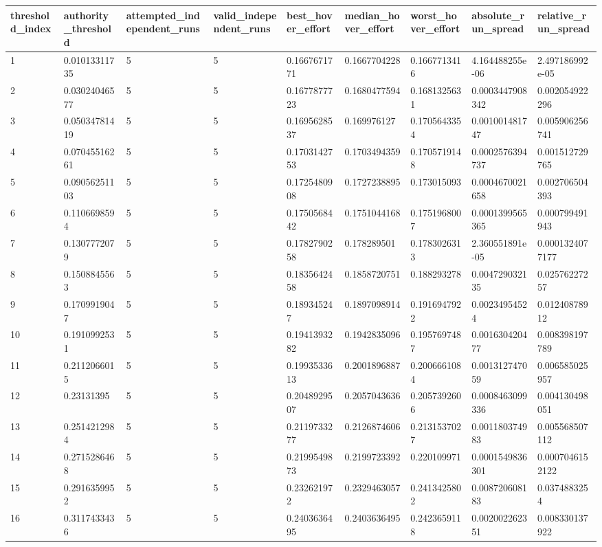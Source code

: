 \begin{tabular}{@{}lllllllll@{}}
\toprule
threshold\_index & authority\_threshold & attempted\_independent\_runs & valid\_independent\_runs & best\_hover\_effort & median\_hover\_effort & worst\_hover\_effort & absolute\_run\_spread & relative\_run\_spread \\
\midrule
1 & 0.01013311735 & 5 & 5 & 0.1667671771 & 0.1667704228 & 0.1667713416 & 4.164488255e-06 & 2.497186992e-05 \\
2 & 0.03024046577 & 5 & 5 & 0.1677877723 & 0.1680477594 & 0.1681325631 & 0.0003447908342 & 0.002054922296 \\
3 & 0.05034781419 & 5 & 5 & 0.1695628537 & 0.169976127 & 0.1705643354 & 0.001001481747 & 0.005906256741 \\
4 & 0.07045516261 & 5 & 5 & 0.1703142753 & 0.1703494359 & 0.1705719148 & 0.0002576394737 & 0.001512729765 \\
5 & 0.09056251103 & 5 & 5 & 0.1725480908 & 0.1727238895 & 0.173015093 & 0.0004670021658 & 0.002706504393 \\
6 & 0.1106698594 & 5 & 5 & 0.1750568442 & 0.1751044168 & 0.1751968007 & 0.0001399565365 & 0.000799491943 \\
7 & 0.1307772079 & 5 & 5 & 0.1782790258 & 0.178289501 & 0.1783026313 & 2.360551891e-05 & 0.0001324077177 \\
8 & 0.1508845563 & 5 & 5 & 0.1835642458 & 0.1858720751 & 0.188293278 & 0.004729032135 & 0.02576227257 \\
9 & 0.1709919047 & 5 & 5 & 0.189345247 & 0.1897098914 & 0.1916947922 & 0.00234954524 & 0.01240878912 \\
10 & 0.1910992531 & 5 & 5 & 0.1941393282 & 0.1942835096 & 0.1957697487 & 0.001630420477 & 0.008398197789 \\
11 & 0.2112066015 & 5 & 5 & 0.1993533613 & 0.2001896887 & 0.2006661084 & 0.001312747059 & 0.006585025957 \\
12 & 0.23131395 & 5 & 5 & 0.2048929507 & 0.2057043636 & 0.2057392606 & 0.0008463099336 & 0.004130498051 \\
13 & 0.2514212984 & 5 & 5 & 0.2119733277 & 0.2126874606 & 0.2131537027 & 0.001180374983 & 0.005568507112 \\
14 & 0.2715286468 & 5 & 5 & 0.2199549873 & 0.2199723392 & 0.220109971 & 0.0001549836301 & 0.0007046152122 \\
15 & 0.2916359952 & 5 & 5 & 0.232621972 & 0.2329463057 & 0.2413425802 & 0.008720608183 & 0.0374883254 \\
16 & 0.3117433436 & 5 & 5 & 0.2403636495 & 0.2403636495 & 0.2423659118 & 0.002002262351 & 0.008330137922 \\

\end{tabular}
